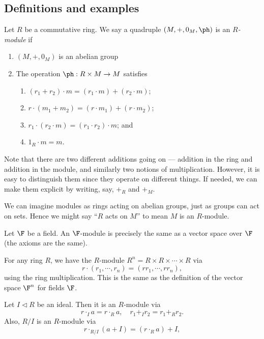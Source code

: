 \documentclass[a4paper]{article}
\begin{document}
\subsection{Definitions and examples}
\begin{defi}[Module]
  Let $R$ be a commutative ring. We say a quadruple $(M, +, 0_M, \ph)$ is an \emph{$R$-module} if
  \begin{enumerate}
    \item $(M, +, 0_M)$ is an abelian group
    \item The operation $\ph: R \times M \to M$ satisfies
      \begin{enumerate}
        \item $(r_1 + r_2) \cdot m = (r_1 \cdot m) + (r_2 \cdot m)$;
        \item $r\cdot (m_1 + m_2) = (r\cdot m_1) + (r\cdot m_2)$;
        \item $r_1 \cdot (r_2 \cdot m) = (r_1 \cdot r_2) \cdot m$; and
        \item $1_R \cdot m = m$.
      \end{enumerate}
  \end{enumerate}
\end{defi}
Note that there are two different additions going on --- addition in the ring and addition in the module, and similarly two notions of multiplication. However, it is easy to distinguish them since they operate on different things. If needed, we can make them explicit by writing, say, $+_R$ and $+_M$.

We can imagine modules as rings acting on abelian groups, just as groups can act on sets. Hence we might say ``$R$ acts on $M$'' to mean $M$ is an $R$-module.

\begin{eg}
  Let $\F$ be a field. An $\F$-module is precisely the same as a vector space over $\F$ (the axioms are the same).
\end{eg}

\begin{eg}
  For any ring $R$, we have the $R$-module $R^n = R \times R \times \cdots \times R$ via
  \[
    r\cdot (r_1, \cdots, r_n) = (rr_1, \cdots, rr_n),
  \]
  using the ring multiplication. This is the same as the definition of the vector space $\F^n$ for fields $\F$.
\end{eg}

\begin{eg}
  Let $I \lhd R$ be an ideal. Then it is an $R$-module via
  \[
    r \cdot_I a = r\cdot_R a,\quad r_1 +_I r_2 = r_1 +_R r_2.
  \]
  Also, $R/I$ is an $R$-module via
  \[
    r\cdot_{R/I} (a + I) = (r\cdot_R a) + I,
  \]
\end{eg}
\end{document}
